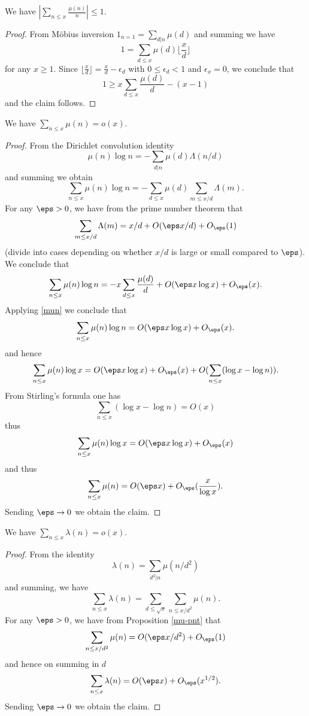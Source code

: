 \begin{proposition}\label{mun}\leanok
We have $|\sum_{n \leq x} \frac{\mu(n)}{n}| \leq 1$.
\end{proposition}


\begin{proof}
From M\"obius inversion $1_{n=1} = \sum_{d|n} \mu(d)$ and summing we have
  $$ 1 = \sum_{d \leq x} \mu(d) \lfloor \frac{x}{d} \rfloor$$
  for any $x \geq 1$. Since $\lfloor \frac{x}{d} \rfloor = \frac{x}{d} - \epsilon_d$ with
  $0 \leq \epsilon_d < 1$ and $\epsilon_x = 0$, we conclude that
  $$ 1 ≥ x \sum_{d \leq x} \frac{\mu(d)}{d} - (x - 1)$$
  and the claim follows.
\end{proof}


\begin{proposition}\label{mu-pnt}\leanok  We have $\sum_{n \leq x} \mu(n) = o(x)$.
\end{proposition}


\begin{proof}
From the Dirichlet convolution identity
  $$ \mu(n) \log n = - \sum_{d|n} \mu(d) \Lambda(n/d)$$
and summing we obtain
$$ \sum_{n \leq x} \mu(n) \log n = - \sum_{d \leq x} \mu(d) \sum_{m \leq x/d} \Lambda(m).$$
For any $\eps>0$, we have from the prime number theorem that
$$ \sum_{m \leq x/d} \Lambda(m) = x/d + O(\eps x/d) + O_\eps(1)$$
(divide into cases depending on whether $x/d$ is large or small compared to $\eps$).
We conclude that
$$ \sum_{n \leq x} \mu(n) \log n = - x \sum_{d \leq x} \frac{\mu(d)}{d} + O(\eps x \log x) + O_\eps(x).$$
Applying \eqref{mun} we conclude that
$$ \sum_{n \leq x} \mu(n) \log n = O(\eps x \log x) + O_\eps(x).$$
and hence
$$ \sum_{n \leq x} \mu(n) \log x = O(\eps x \log x) + O_\eps(x) + O( \sum_{n \leq x} (\log x - \log n) ).$$
From Stirling's formula one has
$$  \sum_{n \leq x} (\log x - \log n) = O(x)$$
thus
$$ \sum_{n \leq x} \mu(n) \log x = O(\eps x \log x) + O_\eps(x)$$
and thus
$$ \sum_{n \leq x} \mu(n) = O(\eps x) + O_\eps(\frac{x}{\log x}).$$
Sending $\eps \to 0$ we obtain the claim.
\end{proof}


\begin{proposition}\label{lambda-pnt}\leanok
We have $\sum_{n \leq x} \lambda(n) = o(x)$.
\end{proposition}


\begin{proof}
From the identity
  $$ \lambda(n) = \sum_{d^2|n} \mu(n/d^2)$$
and summing, we have
$$ \sum_{n \leq x} \lambda(n) = \sum_{d \leq \sqrt{x}} \sum_{n \leq x/d^2} \mu(n).$$
For any $\eps>0$, we have from Proposition \ref{mu-pnt} that
$$ \sum_{n \leq x/d^2} \mu(n) = O(\eps x/d^2) + O_\eps(1)$$
and hence on summing in $d$
$$ \sum_{n \leq x} \lambda(n) = O(\eps x) + O_\eps(x^{1/2}).$$
Sending $\eps \to 0$ we obtain the claim.
\end{proof}


